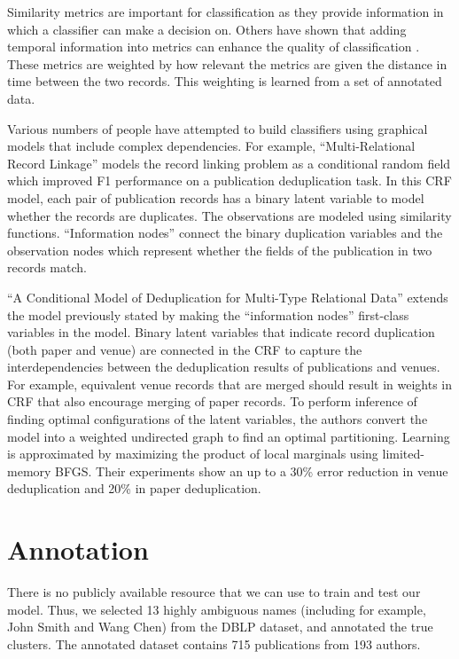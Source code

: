 \documentclass[twocolumn,letterpaper]{article}
\begin{document}
Similarity metrics are important for classification as they provide information in which a classifier can make a decision on. Others have shown that adding temporal information into metrics can enhance the quality of classification \cite{DBLP:journals/fcsc/LiDMS12}. These metrics are weighted by how relevant the metrics are given the distance in time between the two records. This weighting is learned from a set of annotated data.

Various numbers of people have attempted to build classifiers using graphical models that include complex dependencies. For example, ``Multi-Relational Record Linkage'' \cite{Domingos04multi} models the record linking problem as a conditional random field which improved F1 performance on a publication deduplication task. In this CRF model, each pair of publication records has a binary latent variable to model whether the records are duplicates.  The observations are modeled using similarity functions.  ``Information nodes'' connect the binary duplication variables and the observation nodes which represent whether the fields of the publication in two records match.

``A Conditional Model of Deduplication for Multi-Type Relational Data'' \cite{Culotta05aconditional} extends the model previously stated by making the ``information nodes'' first-class variables in the model.  Binary latent variables that indicate record duplication (both paper and venue) are connected in the CRF to capture the interdependencies between the deduplication results of publications and venues.  For example, equivalent venue records that are merged should result in weights in CRF that also encourage merging of paper records.  To perform inference of finding optimal configurations of the latent variables, the authors convert the model into a weighted undirected graph to find an optimal partitioning.  Learning is approximated by maximizing the product of local marginals using limited-memory BFGS.  Their experiments show an up to a 30\% error reduction in venue deduplication and 20\% in paper deduplication.

\section{Annotation} %
\label{sec:annotation}
There is no publicly available resource that we can use to train and test our model.  Thus, we selected 13 highly ambiguous names (including for example, John Smith and Wang Chen) from the DBLP dataset, and annotated the true clusters.  The annotated dataset contains 715 publications from 193 authors.
\end{document}
